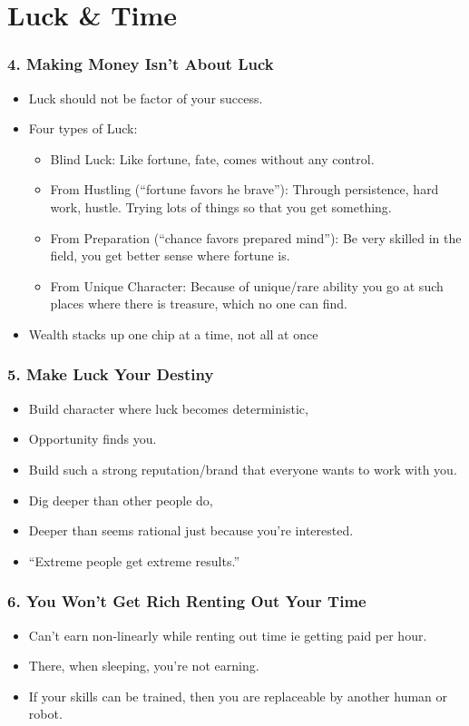 \section{Luck \& Time}

\begin{frame}[fragile]
\frametitle{4. Making Money Isn't About Luck}
\begin{itemize}
\item Luck should not be factor of your success.
\item Four types of Luck:
\begin{itemize}
\item Blind Luck: Like fortune, fate, comes without any control.
\item From Hustling (``fortune favors he brave''): Through persistence, hard work, hustle. Trying lots of things so that you get something.
\item From Preparation (``chance favors prepared mind''): Be very skilled in the field, you get better sense where fortune is.
\item From Unique Character: Because of unique/rare ability you go at such places where there is treasure, which no one can find.
\end{itemize}
\item Wealth stacks up one chip at a time, not all at once

\end{itemize}
\end{frame}

\begin{frame}[fragile]
\frametitle{5. Make Luck Your Destiny}
\begin{itemize}
\item Build character where luck becomes deterministic, 
\item Opportunity finds you.
\item Build such a strong reputation/brand that everyone wants to work with you.
\item Dig deeper than other people do, 
\item Deeper than seems rational just because you're interested. 
\item ``Extreme people get extreme results.''
\end{itemize}
\end{frame}

\begin{frame}[fragile]
\frametitle{6. You Won't Get Rich Renting Out Your Time}
\begin{itemize}
\item Can't earn non-linearly while renting out time ie getting paid per hour.
\item There, when sleeping, you're not earning.
\item If your skills can be trained, then you are replaceable by another human or robot.
\end{itemize}
\end{frame}



